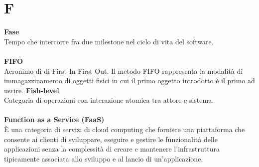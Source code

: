 \section{F}
\textbf{Fase}\\
Tempo che intercorre fra due milestone nel ciclo di vita del software. \\ \\
\textbf{FIFO}\\
Acronimo di di First In First Out. Il metodo FIFO rappresenta la modalità di immagazzinamento di oggetti fisici in cui il primo oggetto introdotto è il primo ad uscire. 
\textbf{Fish-level}\\
Categoria di operazioni con interazione atomica tra attore e sistema. \\ \\
\textbf{Function as a Service (FaaS)}\\
È una categoria di servizi di cloud computing che fornisce una piattaforma che consente ai clienti di sviluppare, eseguire e gestire le funzionalità delle applicazioni senza la complessità di creare e mantenere l'infrastruttura tipicamente associata allo sviluppo e al lancio di un'applicazione. \\ \\
\clearpage